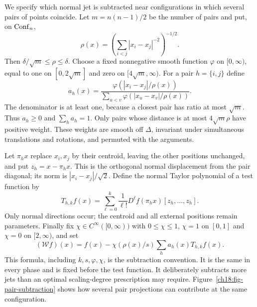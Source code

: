 We specify which normal jet is subtracted near configurations in which several pairs of points coincide.
Let $m=n(n-1)/2$ be the number of pairs and put, on $\operatorname{Conf}_n$,
\[
 \rho(x)=\left(\sum_{i<j}|x_i-x_j|^{-2}\right)^{-1/2}.
\]
Then $\delta/\sqrt m\le\rho\le\delta$.
Choose a fixed nonnegative smooth function $\varphi$ on $[0,\infty)$,
equal to one on $[0,2\sqrt m]$ and zero on $[4\sqrt m,\infty)$.
For a pair $h=\{i,j\}$ define
\begin{equation}
 a_h(x)=\frac{\varphi(|x_i-x_j|/\rho(x))}
                   {\sum_{u<v}\varphi(|x_u-x_v|/\rho(x))}.
 \label{ch18:pair-weights}
\end{equation}
The denominator is at least one, because a closest pair has ratio at
most $\sqrt m$. Thus $a_h\ge0$ and $\sum_h a_h=1$.
Only pairs whose distance is at most $4\sqrt m\rho$ have positive weight.
These weights are smooth off $\Delta$, invariant under simultaneous
translations and rotations, and permuted with the arguments.

Let $\pi_hx$ replace $x_i,x_j$ by their centroid, leaving the other
positions unchanged, and put $z_h=x-\pi_hx$. This is the orthogonal
normal displacement from the pair diagonal; its norm is
$|x_i-x_j|/\sqrt2$. Define the normal Taylor polynomial of a test function by
\begin{equation}
 T_{h,k}f(x)=\sum_{\ell=0}^k\frac1{\ell!}
             D^\ell f(\pi_hx)[z_h,\ldots,z_h].
 \label{ch18:normal-Taylor}
\end{equation}
Only normal directions occur; the centroid and all external positions
remain parameters. Finally fix $\chi\in C^\infty([0,\infty))$ with
$0\le\chi\le1$, $\chi=1$ on $[0,1]$ and $\chi=0$ on $[2,\infty)$,
and set
\begin{equation}
 (\mathcal W f)(x)=f(x)-\chi(\rho(x)/s)
                                  \sum_h a_h(x)T_{h,k}f(x).
 \label{ch18:subtraction}
\end{equation}
This formula, including $k,s,\varphi,\chi$, is the subtraction convention.
It is the same in every phase and is fixed before the test function.
It deliberately subtracts more jets than an optimal scaling-degree
prescription may require.
Figure~\ref{ch18:fig-pair-subtraction} shows how several pair projections
can contribute at the same configuration.



